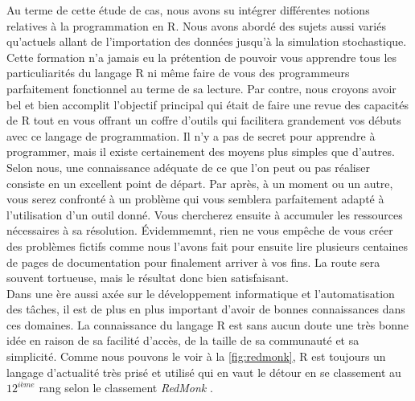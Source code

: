 Au terme de cette étude de cas, nous avons su intégrer différentes notions relatives à la programmation en R. Nous avons abordé des sujets aussi variés qu'actuels allant de l'importation des données jusqu'à la simulation stochastique. \\

Cette formation n'a jamais eu la prétention de pouvoir vous apprendre tous les particuliarités du langage R ni même faire de vous des programmeurs parfaitement fonctionnel au terme de sa lecture. Par contre, nous croyons avoir bel et bien accomplit l'objectif principal qui était de faire une revue des capacités de R tout en vous offrant un coffre d'outils qui facilitera grandement vos débuts avec ce langage de programmation. Il n'y a pas de secret pour apprendre à programmer, mais il existe certainement des moyens plus simples que d'autres. Selon nous, une connaissance adéquate de ce que l'on peut ou pas réaliser consiste en un excellent point de départ. Par après, à un moment ou un autre, vous serez confronté à un problème qui vous semblera parfaitement adapté à l'utilisation d'un outil donné. Vous chercherez ensuite à accumuler les ressources nécessaires à sa résolution. Évidemmemnt, rien ne vous empêche de vous créer des problèmes fictifs comme nous l'avons fait pour ensuite lire plusieurs centaines de pages de documentation pour finalement arriver à vos fins. La route sera souvent tortueuse, mais le résultat donc bien satisfaisant. \\

Dans une ère aussi axée sur le développement informatique et l'automatisation des tâches, il est de plus en plus important d'avoir de bonnes connaissances dans ces domaines. La connaissance du langage R est sans aucun doute une très bonne idée en raison de sa facilité d'accès, de la taille de sa communauté et sa simplicité. Comme nous pouvons le voir à la \autoref{fig:redmonk}, R est toujours un langage d'actualité très prisé et utilisé qui en vaut le détour en se classement au $12^{ième}$ rang selon le classement \emph{RedMonk} \cite{codingGame}. \\



